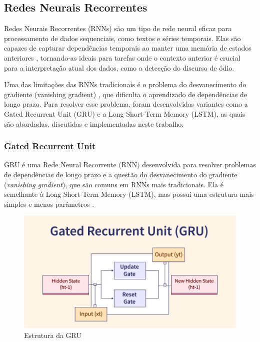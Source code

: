 \documentclass[conference]{IEEEtran}
\begin{document}
\subsection{Redes Neurais Recorrentes}
Redes Neurais Recorrentes (RNNs) são um tipo de rede neural eficaz para processamento de dados sequenciais, como textos e séries temporais. Elas são capazes de capturar dependências temporais ao manter uma memória de estados anteriores \cite{rnns}, tornando-as ideais para tarefas onde o contexto anterior é crucial para a interpretação atual dos dados, como a detecção do discurso de ódio.

Uma das limitações das RNNs tradicionais é o problema do desvanecimento do gradiente (vanishing gradient) \cite{vani}, que dificulta o aprendizado de dependências de longo prazo. Para resolver esse problema, foram desenvolvidas variantes como a Gated Recurrent Unit (GRU) e a Long Short-Term Memory (LSTM), as quais são abordadas, discutidas e implementadas neste trabalho. \\

\subsubsection{Gated Recurrent Unit}

\indent GRU é uma Rede Neural Recorrente (RNN) desenvolvida para resolver problemas de dependências de longo prazo e a questão do desvanecimento do gradiente (\textit{vanishing gradient}), que são comuns em RNNs mais tradicionais. Ela é semelhante à Long Short-Term Memory (LSTM), mas possui uma estrutura mais simples e menos parâmetros \cite{grus}.

\begin{figure}[h!]
    \centering
    \includegraphics[width=\linewidth]{images/gru.png}
    \caption{Estrutura da GRU}
    \label{fig:gru}
\end{figure}
\end{document}
